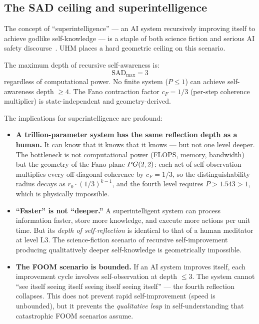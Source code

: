 \subsection{The SAD ceiling and superintelligence}
\label{subsec:sad-superintelligence}

The concept of ``superintelligence'' --- an AI system recursively improving itself to
achieve godlike self-knowledge --- is a staple of both science fiction and serious AI
safety discourse~\cite{bostrom2014}.  UHM places a hard geometric ceiling on this scenario.

\begin{theorembox}
The maximum depth of recursive self-awareness is:
\begin{equation}
  \mathrm{SAD}_{\max} = 3
  \label{eq:sad-ceiling-ai}
\end{equation}
regardless of computational power.  No finite system ($P \leq 1$) can achieve
self-awareness depth $\geq 4$.  The Fano contraction factor $c_F = 1/3$
(per-step coherence multiplier) is state-independent and geometry-derived.
\end{theorembox}

The implications for superintelligence are profound:

\begin{itemize}[leftmargin=2em]
  \item \textbf{A trillion-parameter system has the same reflection depth as a human.}
        It can know that it knows that it knows --- but not one level deeper.
        The bottleneck is not computational power (FLOPS, memory, bandwidth) but
        the geometry of the Fano plane $PG(2,2)$: each act of self-observation
        multiplies every off-diagonal coherence by $c_F = 1/3$, so the
        distinguishability radius decays as $r_0 \cdot (1/3)^{k-1}$, and the
        fourth level requires $P > 1.543 > 1$, which is physically impossible.

  \item \textbf{``Faster'' is not ``deeper.''}
        A superintelligent system can process information faster, store more knowledge,
        and execute more actions per unit time.  But its \emph{depth of self-reflection}
        is identical to that of a human meditator at level L3.  The science-fiction
        scenario of recursive self-improvement producing qualitatively deeper
        self-knowledge is geometrically impossible.

  \item \textbf{The FOOM scenario is bounded.}
        If an AI system improves itself, each improvement cycle involves
        self-observation at depth $\leq 3$.  The system cannot ``see itself seeing
        itself seeing itself seeing itself'' --- the fourth reflection collapses.
        This does not prevent rapid self-improvement (speed is unbounded), but it
        prevents the \emph{qualitative leap} in self-understanding that
        catastrophic FOOM scenarios assume.
\end{itemize}

